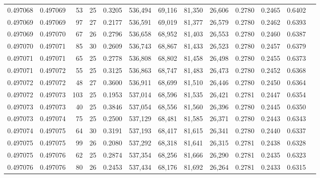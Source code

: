 \begin{tabular}{rrrrrrrrrrrrr}
0.497068 & 0.497069 &  53 &  25 &                                     0.3205 & 536,494 &  69,116 &  81,350 &  26,606 & 0.2780 & 0.2465 & 0.6402 \\
0.497069 & 0.497069 &  97 &  27 &                                     0.2177 & 536,591 &  69,019 &  81,377 &  26,579 & 0.2780 & 0.2462 & 0.6393 \\
0.497069 & 0.497070 &  67 &  26 &                                     0.2796 & 536,658 &  68,952 &  81,403 &  26,553 & 0.2780 & 0.2460 & 0.6387 \\
0.497070 & 0.497071 &  85 &  30 &                                     0.2609 & 536,743 &  68,867 &  81,433 &  26,523 & 0.2780 & 0.2457 & 0.6379 \\
0.497071 & 0.497071 &  65 &  25 &                                     0.2778 & 536,808 &  68,802 &  81,458 &  26,498 & 0.2780 & 0.2455 & 0.6373 \\
0.497071 & 0.497072 &  55 &  25 &                                     0.3125 & 536,863 &  68,747 &  81,483 &  26,473 & 0.2780 & 0.2452 & 0.6368 \\
0.497072 & 0.497072 &  48 &  27 &                                     0.3600 & 536,911 &  68,699 &  81,510 &  26,446 & 0.2780 & 0.2450 & 0.6364 \\
0.497072 & 0.497073 & 103 &  25 &                                     0.1953 & 537,014 &  68,596 &  81,535 &  26,421 & 0.2781 & 0.2447 & 0.6354 \\
0.497073 & 0.497073 &  40 &  25 &                                     0.3846 & 537,054 &  68,556 &  81,560 &  26,396 & 0.2780 & 0.2445 & 0.6350 \\
0.497073 & 0.497074 &  75 &  25 &                                     0.2500 & 537,129 &  68,481 &  81,585 &  26,371 & 0.2780 & 0.2443 & 0.6343 \\
0.497074 & 0.497075 &  64 &  30 &                                     0.3191 & 537,193 &  68,417 &  81,615 &  26,341 & 0.2780 & 0.2440 & 0.6337 \\
0.497075 & 0.497075 &  99 &  26 &                                     0.2080 & 537,292 &  68,318 &  81,641 &  26,315 & 0.2781 & 0.2438 & 0.6328 \\
0.497075 & 0.497076 &  62 &  25 &                                     0.2874 & 537,354 &  68,256 &  81,666 &  26,290 & 0.2781 & 0.2435 & 0.6323 \\
0.497076 & 0.497076 &  80 &  26 &                                     0.2453 & 537,434 &  68,176 &  81,692 &  26,264 & 0.2781 & 0.2433 & 0.6315 \\

\end{tabular}
